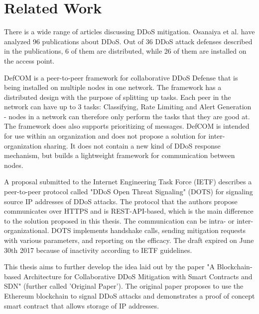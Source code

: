\chapter{Related Work}

There is a wide range of articles discussing DDoS mitigation. Osanaiya et al. \cite{DDoSOverview} have analyzed 96 publications about DDoS. Out of 36 DDoS attack defenses described in the publications, 6 of them are distributed, while 26 of them are installed on the access point. 

DefCOM \cite{DefCOM} is a peer-to-peer framework for collaborative DDoS Defense that is being installed on multiple nodes in one network. The framework has a distributed design with the purpose of splitting up tasks. Each peer in the network can have up to 3 tasks: Classifying, Rate Limiting and Alert Generation - nodes in a network can therefore only perform the tasks that they are good at. The framework does also supports prioritizing of messages. DefCOM is intended for use within an organization and does not propose a solution for inter-organization sharing. It does not contain a new kind of DDoS response mechanism, but builds a lightweight framework for communication between nodes.

A proposal submitted to the Internet Engineering Task Force (IETF) \cite{IETFDraft} describes a peer-to-peer protocol called "DDoS Open Threat Signaling" (DOTS) for signaling source IP addresses of DDoS attacks. The protocol that the authors propose communicates over HTTPS and is REST-API-based, which is the main difference to the solution proposed in this thesis. The communication can be intra- or  inter-organizational. DOTS implements handshake calls, sending mitigation requests with various parameters, and reporting on the efficacy. The draft expired on June 30th 2017 because of inactivity according to IETF guidelines.

This thesis aims to further develop the idea laid out by the paper "A Blockchain-based Architecture for Collaborative DDoS Mitigation with Smart Contracts and SDN" \cite{OriginalPaper} (further called 'Original Paper'). The original paper proposes to use the Ethereum blockchain to signal DDoS attacks and demonstrates a proof of concept smart contract that allows storage of IP addresses. 
